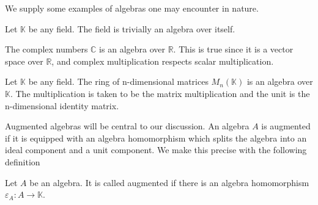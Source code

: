 \documentclass[../thesis.tex]{subfiles}
\begin{document}







            We supply some examples of algebras one may encounter in nature.

            \begin{example}
                Let $\mathbb{K}$ be any field. The field is trivially an algebra over itself.
            \end{example}

            \begin{example}
                The complex numbers $\mathbb{C}$ is an algebra over $\mathbb{R}$. This is true since it is a vector space over $\mathbb{R}$, and complex multiplication respects scalar multiplication.
            \end{example}

            \begin{example}
                Let $\mathbb{K}$ be any field. The ring of n-dimensional matrices $M_n(\mathbb{K})$ is an algebra over $\mathbb{K}$. The multiplication is taken to be the matrix multiplication and the unit is the n-dimensional identity matrix.
            \end{example}

            Augmented algebras will be central to our discussion. An algebra $A$ is augmented if it is equipped with an algebra homomorphism which splits the algebra into an ideal component and a unit component. We make this precise with the following definition

            \begin{definition}
                Let $A$ be an algebra. It is called augmented if there is an algebra homomorphism $\varepsilon_A : A \rightarrow \mathbb{K}$.
            \end{definition}
\end{document}
